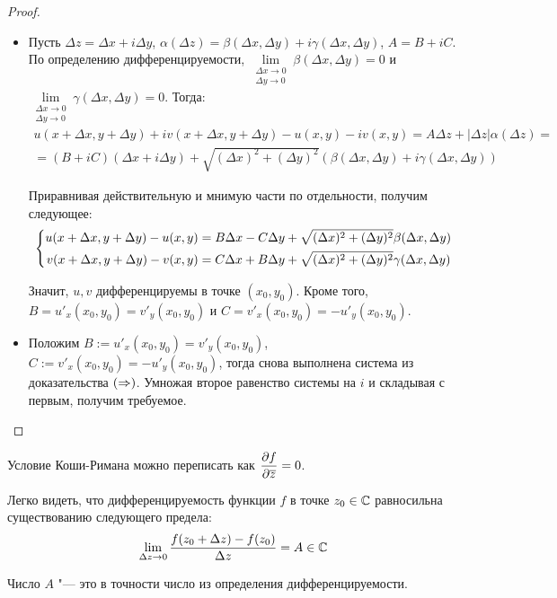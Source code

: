\begin{proof}~
	\begin{itemize}
		\item[$\ra$] Пусть $\Delta z = \Delta x + i \Delta y$, $\alpha(\Delta z) = \beta(\Delta x, \Delta y) + i\gamma(\Delta x, \Delta y)$, $A = B + iC$. По определению дифференцируемости, $\lim\limits_{\substack{\Delta x \to 0 \\ \Delta y \to 0}}\beta(\Delta x, \Delta y) = 0$ и $\lim\limits_{\substack{\Delta x \to 0 \\ \Delta y \to 0}}\gamma(\Delta x, \Delta y) = 0$. Тогда:
		\begin{multline*}
			u(x + \Delta x, y + \Delta y) + iv(x + \Delta x, y + \Delta y) - u(x, y) - iv(x, y) =  A\Delta z + |\Delta z|\alpha(\Delta z) =
			\\
			= (B + iC)(\Delta x + i\Delta y) + \sqrt{(\Delta x)^2 + (\Delta y)^2}(\beta(\Delta x, \Delta y) + i\gamma(\Delta x, \Delta y))
		\end{multline*}
		
		Приравнивая действительную и мнимую части по отдельности, получим следующее:
		\[\left\{\begin{aligned}
			u(x + \Delta x, y + \Delta y) - u(x, y) &=  B\Delta x - C\Delta y + \sqrt{(\Delta x)^2 + (\Delta y)^2}\beta(\Delta x, \Delta y)
			\\
			v(x + \Delta x, y + \Delta y) - v(x, y) &= C\Delta x + B\Delta y + \sqrt{(\Delta x)^2 + (\Delta y)^2}\gamma(\Delta x, \Delta y)
		\end{aligned}\right.\]
	
		Значит, $u, v$ дифференцируемы в точке $(x_0, y_0)$. Кроме того, $B = u'_x(x_0, y_0) = v'_y(x_0, y_0)$ и $C = v'_x(x_0, y_0) = -u'_y(x_0, y_0)$.
		
		\item[$\la$] Положим $B := u'_x(x_0, y_0) = v'_y(x_0, y_0)$, $C := v'_x(x_0, y_0) = -u'_y(x_0, y_0)$, тогда снова выполнена система из доказательства $(\Rightarrow)$. Умножая второе равенство системы на $i$ и складывая с первым, получим требуемое.\qedhere
	\end{itemize}
\end{proof}

\begin{unnecessary}
    \begin{note}
        Условие Коши-Римана можно переписать как \(\mathlarger{\frac{\partial f}{\partial \overline{z}} = 0}\).
    \end{note}
\end{unnecessary}

\begin{note}
	Легко видеть, что дифференцируемость функции $f$ в точке $z_0 \in \mathbb{C}$ равносильна существованию следующего предела:
	\[\lim_{\Delta z \to 0}\frac{f(z_0 + \Delta z) - f(z_0)}{\Delta z} = A \in \mathbb{C}\]
	
	Число $A$ "--- это в точности число из определения дифференцируемости.
\end{note}

